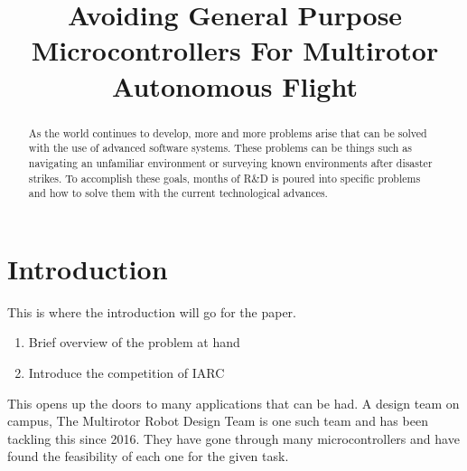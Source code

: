 \documentclass[conference,12pt, ]{IEEEtran}
\begin{document}
\title{Avoiding General Purpose Microcontrollers For Multirotor Autonomous Flight }

\author{
}


\maketitle

\begin{abstract}
As the world continues to develop, more and more problems arise that can be solved with the use of advanced software systems. These problems can be things such as navigating an unfamiliar environment or surveying known environments after disaster strikes. To accomplish these goals, months of R\&D is poured into specific problems and how to solve them with the current technological advances. 
\end{abstract}

\section{Introduction}
This is where the introduction will go for the paper. 
	\begin{enumerate}
		\item Brief overview of the problem at hand
		\item Introduce the competition of IARC
	\end{enumerate}
This opens up the doors to many applications that can be had. A design team on campus, The Multirotor Robot Design Team is one such team and has been tackling this since 2016. They have gone through many microcontrollers and have found the feasibility of each one for the given task.
\end{document}
